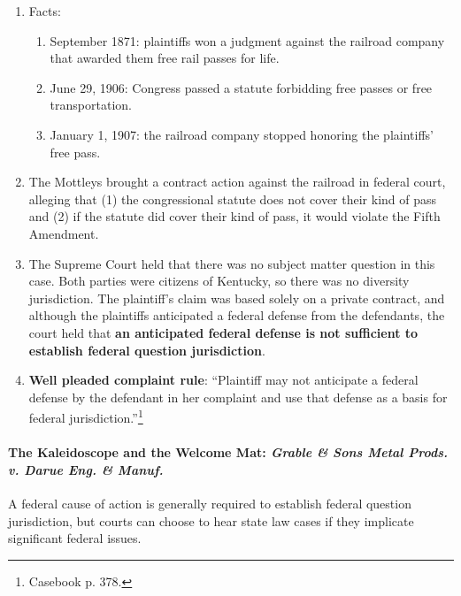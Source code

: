 \begin{enumerate}
    \item Facts:
    \begin{enumerate}
        \item September 1871: plaintiffs won a judgment against the railroad 
        company that awarded them free rail passes for life.
        \item June 29, 1906: Congress passed a statute forbidding free passes 
        or free transportation.
        \item January 1, 1907: the railroad company stopped honoring the 
        plaintiffs' free pass.
    \end{enumerate}
    \item The Mottleys brought a contract action against the railroad in 
    federal court, alleging that (1) the congressional statute does not cover 
    their kind of pass and (2) if the statute did cover their kind of pass, it 
    would violate the Fifth Amendment.
    \item The Supreme Court held that there was no subject matter question in 
    this case. Both parties were citizens of Kentucky, so there was no 
    diversity jurisdiction. The plaintiff's claim was based solely on a 
    private contract, and although the plaintiffs anticipated a federal 
    defense from the defendants, the court held that \textbf{an anticipated 
    federal defense is not sufficient to establish federal question 
    jurisdiction}.
    \item \textbf{Well pleaded complaint rule}: ``Plaintiff may not anticipate 
    a federal defense by the defendant in her complaint and use that defense 
    as a basis for federal jurisdiction.''\footnote{Casebook p. 378.}
\end{enumerate}

\paragraph{The Kaleidoscope and the Welcome Mat: \emph{Grable \& Sons Metal 
Prods. v. Darue Eng. \& Manuf.}}

A federal cause of action is generally required to establish federal question 
jurisdiction, but courts can choose to hear state law cases if they implicate 
significant federal issues.

